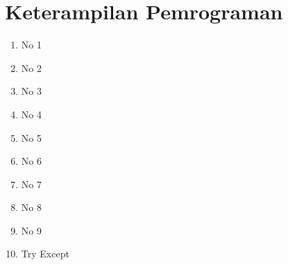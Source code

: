 \documentclass{article}
\begin{document}
\section{Keterampilan Pemrograman}
\begin{enumerate}
    \item No 1
    
    \item No 2
    
    \item No 3
    
    \item No 4
    
    \item No 5
    
\newpage
    \item No 6
    
    \item No 7
    
    \item No 8
    
    \item No 9
    
    \item Try Except
    
\end{enumerate}{}
\end{document}
